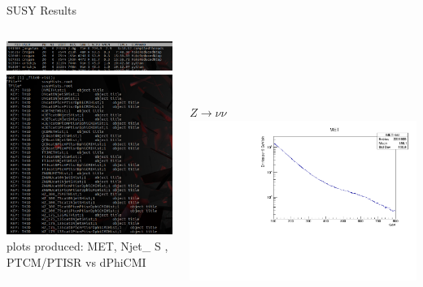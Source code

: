 \documentclass[10pt]{beamer}
\begin{document}
\begin{frame}{SUSY Results}
\begin{columns}
	\begin{column}{0.5\textwidth}
	   		\includegraphics[scale=0.25, left]{cpusage.png}\\
	   		\includegraphics[scale=0.2, left]{terminaltree.png}\\
	   		\tiny
			plots produced:
			MET, Njet\_ S , PTCM/PTISR vs dPhiCMI
	\end{column}
	\begin{column}{0.5\textwidth}
		\quad \quad \\
		\quad \quad \\
		\quad \quad \\
		\quad \quad \\
			\quad \quad $Z\rightarrow \nu \nu$\\
			\includegraphics[scale=0.2, right]{znunuMET.pdf}\\

\end{column}
\end{columns}
\end{frame}
\end{document}
